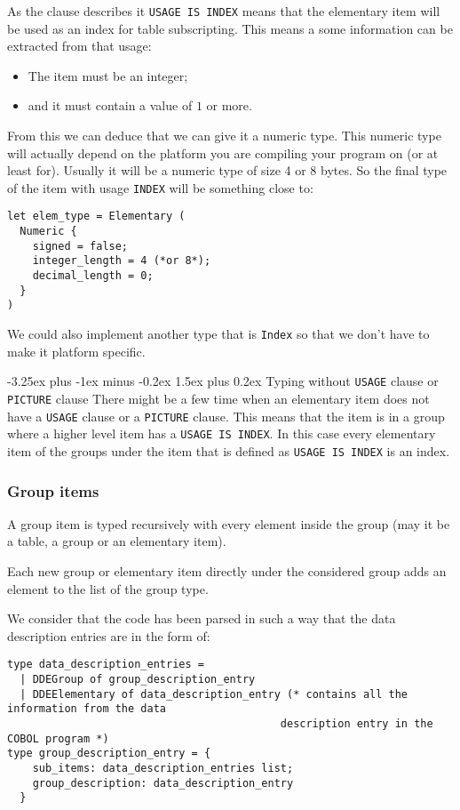 \documentclass[a4paper,10pt]{article}
\makeatletter
\renewcommand{\paragraph}{\@startsection{paragraph}{4}{0ex}%
  {-3.25ex plus -1ex minus -0.2ex}%
  {1.5ex plus 0.2ex}%
{\normalfont\normalsize\bfseries}}
\newcommand{\coboli}[1]{\texttt{#1}}
\newcommand{\usagec}[1]{\texttt{USAGE} clause#1}
\newcommand{\picturec}[1]{\texttt{PICTURE} clause#1}
\makeatother
\begin{document}
As the clause describes it \coboli{USAGE IS INDEX} means that the elementary item will be used as an
index for table subscripting. This means a some information can be extracted from that usage:
\begin{itemize}
  \item The item must be an integer;
  \item and it must contain a value of $1$ or more.
\end{itemize}
From this we can deduce that we can give it a numeric type. This numeric type will actually depend
on the platform you are compiling your program on (or at least for). Usually it will be a
numeric type of size 4 or 8 bytes. So the final type of the item with usage \coboli{INDEX} will be
something close to:
\begin{verbatim}
let elem_type = Elementary (
  Numeric {
    signed = false;
    integer_length = 4 (*or 8*);
    decimal_length = 0;
  }
)
\end{verbatim}
We could also implement another type that is \texttt{Index} so that we don't have to make
it platform specific.

\paragraph{Typing without \usagec{} or \picturec{}}
There might be a few time when an elementary item does not have a \usagec{} or a \picturec{}. This
means that the item is in a group where a higher level item has a \coboli{USAGE IS INDEX}. In this
case every elementary item of the groups under the item that is defined as \coboli{USAGE IS INDEX}
is an index.

\subsubsection{Group items}
A group item is typed recursively with every element inside the group (may it be a table, a group
or an elementary item).

Each new group or elementary item directly under the considered group adds an element to the list
of the group type.

We consider that the code has been parsed in such a way that the data description entries are in
the form of:
\begin{verbatim}
type data_description_entries =
  | DDEGroup of group_description_entry
  | DDEElementary of data_description_entry (* contains all the information from the data
                                           description entry in the COBOL program *)
type group_description_entry = {
    sub_items: data_description_entries list;
    group_description: data_description_entry
  }
\end{verbatim}
\end{document}

